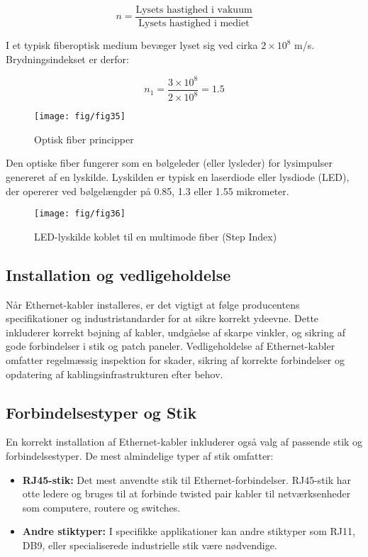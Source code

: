 \[
n = \frac{\text{Lysets hastighed i vakuum}}{\text{Lysets hastighed i mediet}}
\]

I et typisk fiberoptisk medium bevæger lyset sig ved cirka \(2 \times 10^8\) m/s. Brydningsindekset er derfor:

\[
n_1 = \frac{3 \times 10^8}{2 \times 10^8} = 1.5
\]

\begin{figure}[h!]
	\centering
	\texttt{[image: fig/fig35]}
	\caption{Optisk fiber principper}
	\label{fig:optical_fiber_principles}
\end{figure}

Den optiske fiber fungerer som en bølgeleder (eller lysleder) for lysimpulser genereret af en lyskilde. Lyskilden er typisk en laserdiode eller lysdiode (LED), der opererer ved bølgelængder på 0.85, 1.3 eller 1.55 mikrometer.

\begin{figure}[h!]
	\centering
	\texttt{[image: fig/fig36]}
	\caption{LED-lyskilde koblet til en multimode fiber (Step Index)}
	\label{fig:led_fiber}
\end{figure}

\subsection{Installation og vedligeholdelse}
Når Ethernet-kabler installeres, er det vigtigt at følge producentens specifikationer og industristandarder for at sikre korrekt ydeevne. Dette inkluderer korrekt bøjning af kabler, undgåelse af skarpe vinkler, og sikring af gode forbindelser i stik og patch paneler.
\newline
\newline
\noindent Vedligeholdelse af Ethernet-kabler omfatter regelmæssig inspektion for skader, sikring af korrekte forbindelser og opdatering af kablingsinfrastrukturen efter behov.

\subsection{Forbindelsestyper og Stik}
En korrekt installation af Ethernet-kabler inkluderer også valg af passende stik og forbindelsestyper. De mest almindelige typer af stik omfatter:
\begin{itemize}
	\item \textbf{RJ45-stik:} Det mest anvendte stik til Ethernet-forbindelser. RJ45-stik har otte ledere og bruges til at forbinde twisted pair kabler til netværksenheder som computere, routere og switches.
	\item \textbf{Andre stiktyper:} I specifikke applikationer kan andre stiktyper som RJ11, DB9, eller specialiserede industrielle stik være nødvendige.
\end{itemize}

